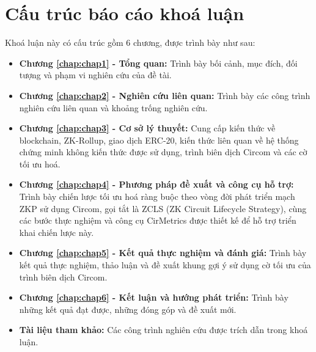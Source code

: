 \section{Cấu trúc báo cáo khoá luận}
Khoá luận này có cấu trúc gồm 6 chương, được trình bày như sau: 
\begin{itemize}
    \item \textbf{Chương \ref{chap:chap1} - Tổng quan:} Trình bày bối cảnh, mục đích, đối tượng và phạm vi nghiên cứu của đề tài.
    \item \textbf{Chương \ref{chap:chap2} - Nghiên cứu liên quan:} Trình bày các công trình nghiên cứu liên quan và khoảng trống nghiên cứu.
    \item \textbf{Chương \ref{chap:chap3} - Cơ sở lý thuyết:} Cung cấp kiến thức về blockchain, ZK-Rollup, giao dịch ERC-20, kiến thức liên quan về hệ thống chứng minh không kiến thức được sử dụng, trình biên dịch Circom và các cờ tối ưu hoá.
    \item \textbf{Chương \ref{chap:chap4} - Phương pháp đề xuất và công cụ hỗ trợ:} Trình bày chiến lược tối ưu hoá ràng buộc theo vòng đời phát triển mạch ZKP sử dụng Circom, gọi tắt là ZCLS (ZK Circuit Lifecycle Strategy), cùng các bước thực nghiệm và công cụ CirMetrics được thiết kế để hỗ trợ triển khai chiến lược này.
    \item \textbf{Chương \ref{chap:chap5} - Kết quả thực nghiệm và đánh giá:} Trình bày kết quả thực nghiệm, thảo luận và đề xuất khung gợi ý sử dụng cờ tối ưu của trình biên dịch Circom.
    \item \textbf{Chương \ref{chap:chap6} - Kết luận và hướng phát triển:} Trình bày những kết quả đạt được, những đóng góp và đề xuất mới. 
    \item \textbf{Tài liệu tham khảo:} Các công trình nghiên cứu được trích dẫn trong khoá luận.
\end{itemize}